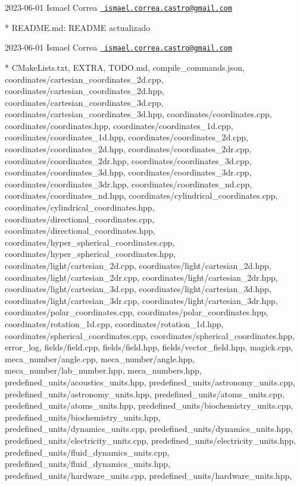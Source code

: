  2023-\/06-\/01 Ismael Correa \href{mailto:ismael.correa.castro@gmail.com}{\texttt{ ismael.\+correa.\+castro@gmail.\+com}} \begin{DoxyVerb}* README.md: README actualizado
\end{DoxyVerb}
 2023-\/06-\/01 Ismael Correa \href{mailto:ismael.correa.castro@gmail.com}{\texttt{ ismael.\+correa.\+castro@gmail.\+com}} \begin{DoxyVerb}* CMakeLists.txt, EXTRA, TODO.md, compile_commands.json,
coordinates/cartesian_coordinates_2d.cpp,
coordinates/cartesian_coordinates_2d.hpp,
coordinates/cartesian_coordinates_3d.cpp,
coordinates/cartesian_coordinates_3d.hpp,
coordinates/coordinates.cpp, coordinates/coordinates.hpp,
coordinates/coordinates_1d.cpp, coordinates/coordinates_1d.hpp,
coordinates/coordinates_2d.cpp, coordinates/coordinates_2d.hpp,
coordinates/coordinates_2dr.cpp, coordinates/coordinates_2dr.hpp,
coordinates/coordinates_3d.cpp, coordinates/coordinates_3d.hpp,
coordinates/coordinates_3dr.cpp, coordinates/coordinates_3dr.hpp,
coordinates/coordinates_nd.cpp, coordinates/coordinates_nd.hpp,
coordinates/cylindrical_coordinates.cpp,
coordinates/cylindrical_coordinates.hpp,
coordinates/directional_coordinates.cpp,
coordinates/directional_coordinates.hpp,
coordinates/hyper_spherical_coordinates.cpp,
coordinates/hyper_spherical_coordinates.hpp,
coordinates/light/cartesian_2d.cpp,
coordinates/light/cartesian_2d.hpp,
coordinates/light/cartesian_2dr.cpp,
coordinates/light/cartesian_2dr.hpp,
coordinates/light/cartesian_3d.cpp,
coordinates/light/cartesian_3d.hpp,
coordinates/light/cartesian_3dr.cpp,
coordinates/light/cartesian_3dr.hpp,
coordinates/polar_coordinates.cpp,
coordinates/polar_coordinates.hpp, coordinates/rotation_1d.cpp,
coordinates/rotation_1d.hpp, coordinates/spherical_coordinates.cpp,
coordinates/spherical_coordinates.hpp, error_log, fields/field.cpp,
fields/field.hpp, fields/vector_field.hpp, magick.cpp,
meca_number/angle.cpp, meca_number/angle.hpp,
meca_number/lab_number.hpp, meca_numbers.hpp,
predefined_units/acoustics_units.hpp,
predefined_units/astronomy_units.cpp,
predefined_units/astronomy_units.hpp,
predefined_units/atoms_units.cpp, predefined_units/atoms_units.hpp,
predefined_units/biochemistry_units.cpp,
predefined_units/biochemistry_units.hpp,
predefined_units/dynamics_units.cpp,
predefined_units/dynamics_units.hpp,
predefined_units/electricity_units.cpp,
predefined_units/electricity_units.hpp,
predefined_units/fluid_dynamics_units.cpp,
predefined_units/fluid_dynamics_units.hpp,
predefined_units/hardware_units.cpp,
predefined_units/hardware_units.hpp,

\end{DoxyVerb}
